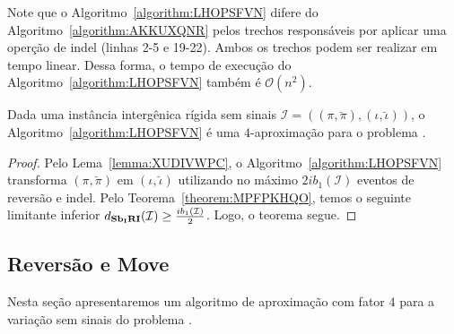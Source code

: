 Note que o Algoritmo~\ref{algorithm:LHOPSFVN} difere do Algoritmo~\ref{algorithm:AKKUXQNR} pelos trechos responsáveis por aplicar uma operção de indel (linhas 2-5 e 19-22). Ambos os trechos podem ser realizar em tempo linear. Dessa forma, o tempo de execução do Algoritmo~\ref{algorithm:LHOPSFVN} também é $\mathcal{O}(n^2)$.

\begin{theorem}\label{theorem:AFAHUIUF}
Dada uma instância intergênica rígida sem sinais $\mathcal{I}=((\pi,\breve\pi),(\iota,\breve\iota))$, o Algoritmo~\ref{algorithm:LHOPSFVN} é uma $4$-aproximação para o problema \SbIRI{}.
\end{theorem}
\begin{proof}
Pelo Lema~\ref{lemma:XUDIVWPC}, o Algoritmo~\ref{algorithm:LHOPSFVN} transforma $(\pi,\breve\pi)$ em $(\iota,\breve\iota)$ utilizando no máximo $2ib_1(\mathcal{I})$ eventos de reversão e indel. Pelo Teorema~\ref{theorem:MPFPKHQO}, temos o seguinte limitante inferior $d_{\textbf{Sb\textsubscript{I}RI}}(\mathcal{I}) \ge \frac{ib_1(\mathcal{I})}{2}$. Logo, o teorema segue. 
\end{proof}

\subsection{Reversão e Move}

Nesta seção apresentaremos um algoritmo de aproximação com fator $4$ para a variação sem sinais do problema \SbIRM{}.

